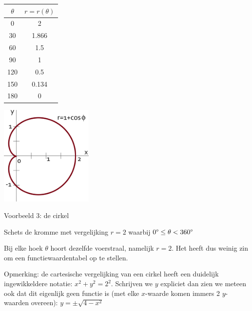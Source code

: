 \begin{minipage}{0.5\linewidth}
	\centering
\begin{tabular}{|c|c|}
\hline 
$\theta$ & $r=r(\theta)$\\
\hline 
\hline 
0\textdegree{} & 2\\
\hline 
30\textdegree{} & 1.866\\
\hline 
60\textdegree{} & 1.5\\
\hline 
90\textdegree{} & 1\\
\hline 
120\textdegree{} & 0.5\\
\hline 
150\textdegree{} & 0.134\\
\hline 
180\textdegree{} & 0\\
\hline 
\end{tabular}
\end{minipage}
\begin{minipage}{.48\linewidth}
	\includegraphics[height=5cm]{2_elem_rekenvaardigheden_B/inputs/figuur7.png}
\end{minipage} 

Voorbeeld 3: de cirkel

Schets de kromme met vergelijking $r=2$ waarbij $0\text{\textdegree}\leq\theta<360\text{\textdegree}$

Bij elke hoek $\theta$ hoort dezelfde voerstraal, namelijk $r=2$.
Het heeft dus weinig zin om een functiewaardentabel op te stellen.

Opmerking: de cartesische vergelijking van een cirkel heeft een duidelijk
ingewikkeldere notatie: $x^{2}+y^{2}=2^{2}$. Schrijven we $y$ expliciet
dan zien we meteen ook dat dit eigenlijk geen functie is (met elke
$x$-waarde komen immers 2 $y$-waarden overeen): $y=\pm\sqrt{4-x^{2}}$


